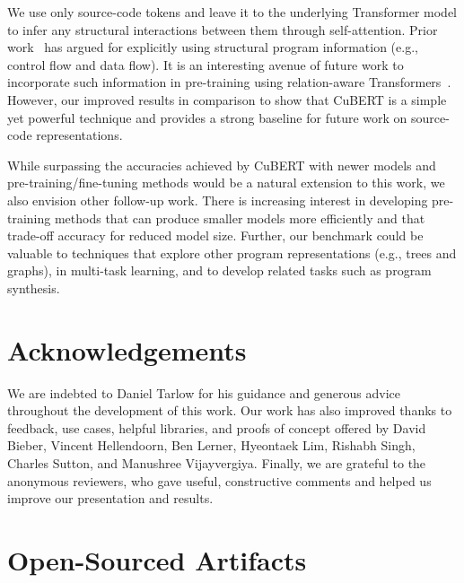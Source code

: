 \documentclass{article}
\newcommand{\BERTforCode}{CuBERT\xspace}
\begin{document}
We use only source-code tokens and leave it to the underlying Transformer model to infer any structural interactions between them through self-attention. Prior work~\citep{graphsiclr2018, hellendoorn2020global} has argued for explicitly using structural program information (e.g., control flow and data flow). It is an interesting avenue of future work to incorporate such information in pre-training using relation-aware Transformers~\citep{shaw2018self}. However, our improved results in comparison to \citet{hellendoorn2020global} show that \BERTforCode is a simple yet powerful technique and provides a strong baseline for future work on source-code representations.


While surpassing the accuracies achieved by \BERTforCode with newer models and pre-training/fine-tuning methods would be a natural extension to this work, we also envision other follow-up work.
There is increasing interest in developing pre-training methods that can produce smaller models more efficiently and that trade-off accuracy for reduced model size. Further, our benchmark could be valuable to techniques that explore other program representations (e.g., trees and graphs), in multi-task learning, and to develop related tasks such as program synthesis.

\section*{Acknowledgements}

We are indebted to Daniel Tarlow for his guidance and generous advice throughout the development of this work. Our work has also improved thanks to feedback, use cases, helpful libraries, and proofs of concept offered by David Bieber, Vincent Hellendoorn, Ben Lerner, Hyeontaek Lim, Rishabh Singh, Charles Sutton, and Manushree Vijayvergiya. Finally, we are grateful to the anonymous reviewers, who gave useful, constructive comments and helped us improve our presentation and results.




\clearpage

\appendix
\section{Open-Sourced Artifacts}
\end{document}
